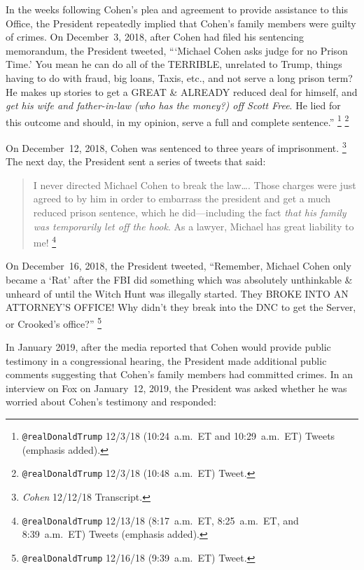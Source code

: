 In the weeks following Cohen's plea and agreement to provide assistance to this Office, the President repeatedly implied that Cohen's family members were guilty of crimes.
On December~3, 2018, after Cohen had filed his sentencing memorandum, the President tweeted, ``\thinspace`Michael Cohen asks judge for no Prison Time.'
You mean he can do all of the TERRIBLE, unrelated to Trump, things having to do with fraud, big loans, Taxis, etc., and not serve a long prison term?
He makes up stories to get a GREAT \& ALREADY reduced deal for himself, and \textit{get his wife and father-in-law (who has the money?) off Scott Free}.
He lied for this outcome and should, in my opinion, serve a full and complete sentence.''%
\footnote{\verb+@realDonaldTrump+ 12/3/18 (10:24~a.m.~ET and 10:29~a.m.~ET) Tweets (emphasis added).}
\footnote{\verb+@realDonaldTrump+ 12/3/18 (10:48~a.m.~ET) Tweet.}

On December~12, 2018, Cohen was sentenced to three years of imprisonment.%
\footnote{\textit{Cohen} 12/12/18 Transcript.}
The next day, the President sent a series of tweets that said:

\begin{quote}
I never directed Michael Cohen to break the law\dots.
Those charges were just agreed to by him in order to embarrass the president and get a much reduced prison sentence, which he did---including the fact \textit{that his family was temporarily let off the hook}.
As a lawyer, Michael has great liability to me!%
\footnote{\verb+@realDonaldTrump+ 12/13/18 (8:17~a.m.~ET, 8:25~a.m.~ET, and 8:39~a.m.~ET) Tweets (emphasis added).}
\end{quote}

On December~16, 2018, the President tweeted, ``Remember, Michael Cohen only became a `Rat' after the FBI did something which was absolutely unthinkable \& unheard of until the Witch Hunt was illegally started.
They BROKE INTO AN ATTORNEY'S OFFICE!
Why didn't they break into the DNC to get the Server, or Crooked's office?''%
\footnote{\verb+@realDonaldTrump+ 12/16/18 (9:39~a.m.~ET) Tweet.}

In January 2019, after the media reported that Cohen would provide public testimony in a congressional hearing, the President made additional public comments suggesting that Cohen's family members had committed crimes.
In an interview on Fox on January~12, 2019, the President was asked whether he was worried about Cohen's testimony and responded:

